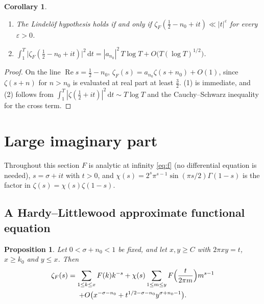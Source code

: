 \documentclass[11pt,reqno]{amsart}
\newtheorem{proposition}[theorem]{Proposition}
\newtheorem{corollary}[theorem]{Corollary}
\theoremstyle{definition}
\theoremstyle{remark}
\newcommand{\dd}{\,\mathrm{d}}
\begin{document}
\begin{corollary}\label{cor:lindelof}
\begin{enumerate}
\item The Lindel\"of hypothesis holds if and only if $\zeta_F(\frac12 - n_0 + it) \ll |t|^\varepsilon$ for every
$\varepsilon > 0$.
\item $\displaystyle\int_1^T\bigl|\zeta_F(\tfrac12 - n_0 + it)\bigr|^2\dd t = |a_{n_0}|^2\,T\log T + O\bigl(T(\log T)^{1/2}\bigr)$.
\end{enumerate}
\end{corollary}

\begin{proof}
On the line $\operatorname{Re}s = \frac12 - n_0$, $\zeta_F(s) = a_{n_0}\zeta(s+n_0) + O(1)$, since
$\zeta(s+n)$ for $n > n_0$ is evaluated at real part at least $\frac32$. (1) is immediate, and (2) follows from
$\int_1^T|\zeta(\frac12+it)|^2\dd t \sim T\log T$ and the Cauchy--Schwarz inequality for the cross term.
\end{proof}

\section{Large imaginary part}\label{sec:larget}

Throughout this section $F$ is analytic at infinity \eqref{eq:f} (no differential equation is needed),
$s = \sigma + it$ with $t > 0$, and
$\chi(s) = 2^s\pi^{s-1}\sin(\pi s/2)\Gamma(1-s)$ is the factor in $\zeta(s) = \chi(s)\zeta(1-s)$.

\subsection{A Hardy--Littlewood approximate functional equation}

\begin{proposition}\label{prop:hl}
Let $0 < \sigma + n_0 < 1$ be fixed, and let $x, y \ge C$ with $2\pi xy = t$, $x \ge k_0$ and $y \le x$. Then
\begin{multline*}
  \zeta_F(s) = \sum_{1\le k\le x}F(k)k^{-s} + \chi(s)\sum_{1\le m\le y}F\Bigl(\frac{t}{2\pi m}\Bigr)m^{s-1} \\
  + O\bigl(x^{-\sigma-n_0} + t^{1/2-\sigma-n_0}y^{\sigma+n_0-1}\bigr).
\end{multline*}
\end{proposition}
\end{document}
